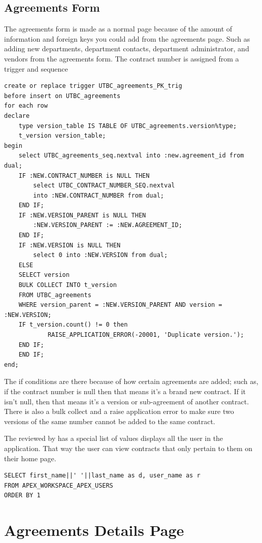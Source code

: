 \documentclass{report}
\begin{document}
\subsection{Agreements Form}
The agreements form is made as a normal page because of the amount of information and foreign keys you could add from the agreements page. Such as adding new departments, department contacts, department administrator, and vendors from the agreements form. The contract number is assigned from a trigger and sequence

\begin{lstlisting}[caption=Agreement table PK trigger]
create or replace trigger UTBC_agreements_PK_trig 
before insert on UTBC_agreements
for each row 
declare
	type version_table IS TABLE OF UTBC_agreements.version%type;
	t_version version_table;
begin 
	select UTBC_agreements_seq.nextval into :new.agreement_id from dual;
	IF :NEW.CONTRACT_NUMBER is NULL THEN
		select UTBC_CONTRACT_NUMBER_SEQ.nextval 
		into :NEW.CONTRACT_NUMBER from dual;
	END IF;
	IF :NEW.VERSION_PARENT is NULL THEN
		:NEW.VERSION_PARENT := :NEW.AGREEMENT_ID;
	END IF;
	IF :NEW.VERSION is NULL THEN
		select 0 into :NEW.VERSION from dual;
	ELSE 
  	SELECT version
  	BULK COLLECT INTO t_version 
  	FROM UTBC_agreements 
  	WHERE version_parent = :NEW.VERSION_PARENT AND version = :NEW.VERSION;
  	IF t_version.count() != 0 then
    		RAISE_APPLICATION_ERROR(-20001, 'Duplicate version.');
  	END IF;
	END IF;
end; 
\end{lstlisting}

The if conditions are there because of how certain agreements are added; such as, if the contract number is null then that means it's a brand new contract. If it isn't null, then that means it's a version or sub-agreement of another contract. There is also a bulk collect and a raise application error to make sure two versions of the same number cannot be added to the same contract.

The reviewed by has a special list of values displays all the user in the application. That way the user can view contracts that only pertain to them on their home page.

\begin{lstlisting}[caption=Reviewed by List of Values]
SELECT first_name||' '||last_name as d, user_name as r
FROM APEX_WORKSPACE_APEX_USERS
ORDER BY 1
\end{lstlisting}


\section{Agreements Details Page}
\end{document}
